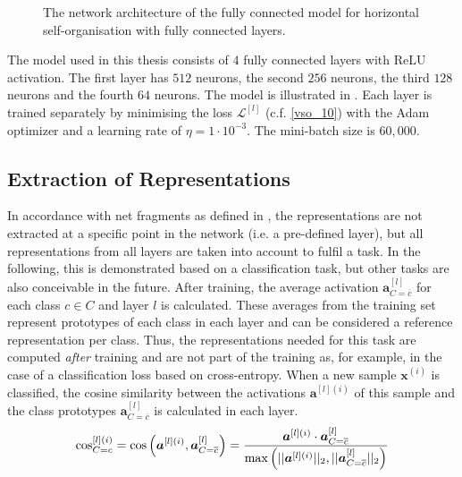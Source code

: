 \begin{figure}[h]
{
}
    \caption[Architecture of the fully connected model with horizontal self-organisation]{The network architecture of the fully connected model for horizontal self-organisation with fully connected layers.}
\end{figure}

The model used in this thesis consists of $4$ fully connected layers with ReLU activation. The first layer has $512$ neurons, the second $256$ neurons, the third $128$ neurons and the fourth $64$ neurons. The model is illustrated in . Each layer is trained separately by minimising the loss  $\mathcal{L}^{[l]}$ (c.f. \eqref{vso_10}) with the Adam optimizer  and a learning rate of $\eta = 1 \cdot 10^{-3}$. The mini-batch size is $60,000$. 

\subsection{Extraction of Representations}
In accordance with net fragments as defined in , the representations are not extracted at a specific point in the network (i.e. a pre-defined layer), but all representations from all layers are taken into account to fulfil a task.
In the following, this is demonstrated based on a classification task, but other tasks are also conceivable in the future.
After training, the average activation {\footnotesize $\boldsymbol{a}^{[l]}_{C=\overline{c}}$} for each class $c \in C$ and layer $l$ is calculated.
These averages from the training set represent prototypes of each class in each layer and can be considered a reference representation per class. Thus, the representations needed for this task are computed \emph{after} training and are not part of the training as, for example, in the case of a classification loss based on cross-entropy.
When a new sample $\boldsymbol{x}^{(i)}$ is classified, the cosine similarity between the activations {\footnotesize $\boldsymbol{a}^{[l](i)}$} of this sample and the class prototypes {\footnotesize $\boldsymbol{a}^{[l]}_{C=\overline{c}}$} is calculated in each layer.
%
\begin{align}\eqlbl{vso_11}
		\text{cos}^{[l](i)}_{C=c} = \text{cos} \left( \boldsymbol{a}^{[l](i)}, \boldsymbol{a}^{[l]}_{C=\overline{c}} \right) = \frac{\boldsymbol{a}^{[l](i)} \cdot \boldsymbol{a}^{[l]}_{C=\overline{c}}}{\max \left( ||\boldsymbol{a}^{[l](i)}||_2, ||\boldsymbol{a}^{[l]}_{C=\overline{c}}||_2 \right) }
\end{align}

